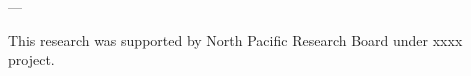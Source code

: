 \documentclass[preprint,NumberedRefs]{JASAnew}
\begin{document}
---

\begin{acknowledgments}
This research was supported by  North Pacific Research Board under xxxx project. 
\end{acknowledgments}















\end{document}
